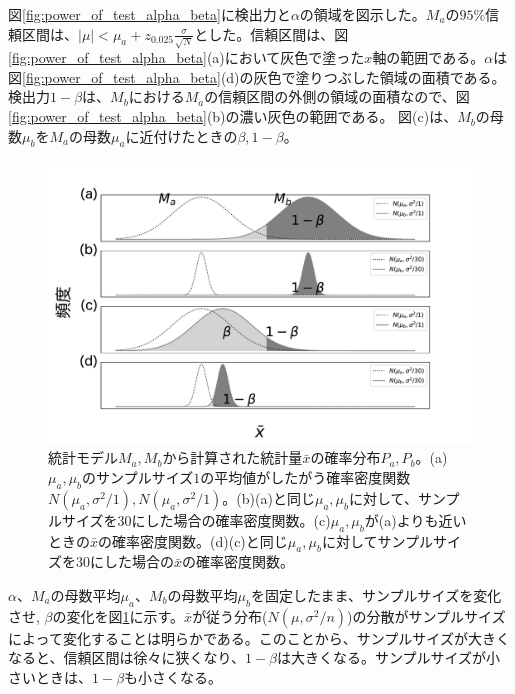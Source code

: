 図\ref{fig:power_of_test_alpha_beta}に検出力と$\alpha$の領域を図示した。$M_a$の$95\%$信頼区間は、$|\mu|<\mu_a+z_{0.025}\frac{\sigma}{\sqrt{N}}$とした。信頼区間は、図\ref{fig:power_of_test_alpha_beta}(a)において灰色で塗った$x$軸の範囲である。$\alpha$は図\ref{fig:power_of_test_alpha_beta}(d)の灰色で塗りつぶした領域の面積である。
検出力$1-\beta$は、$M_b$における$M_a$の信頼区間の外側の領域の面積なので、図\ref{fig:power_of_test_alpha_beta}(b)の濃い灰色の範囲である。
図\label{fig:power_of_test_alpha_beta}(c)は、$M_b$の母数$\mu_b$を$M_a$の母数$\mu_a$に近付けたときの$\beta,1-\beta$。



\begin{figure}
    \begin{center}
        \includegraphics[width=15cm]{./image/04_/power_of_a_test_3.pdf}
        \caption{統計モデル$M_a,M_b$から計算された統計量$\bar{x}$の確率分布$P_a,P_b$。(a)$\mu_a,\mu_b$のサンプルサイズ$1$の平均値がしたがう確率密度関数$N(\mu_a,\sigma^2/1),N(\mu_a,\sigma^2/1)$。(b)(a)と同じ$\mu_a,\mu_b$に対して、サンプルサイズを$30$にした場合の確率密度関数。(c)$\mu_a,\mu_b$が(a)よりも近いときの$\bar{x}$の確率密度関数。(d)(c)と同じ$\mu_a,\mu_b$に対してサンプルサイズを$30$にした場合の$\bar{x}$の確率密度関数。}
        \label{fig:power_of_test_alpha_beta_sample_size}
    \end{center}
    \end{figure}

    

$\alpha$、$M_a$の母数平均$\mu_a$、$M_b$の母数平均$\mu_b$を固定したまま、サンプルサイズを変化させ,
$\beta$の変化を図\ref{fig:power_of_test_alpha_beta_sample_size}に示す。$\bar{x}$が従う分布($N(\mu,\sigma^2/n)$)の分散がサンプルサイズによって変化することは明らかである。このことから、サンプルサイズが大きくなると、信頼区間は徐々に狭くなり、$1-\beta$は大きくなる。サンプルサイズが小さいときは、$1-\beta$も小さくなる。

